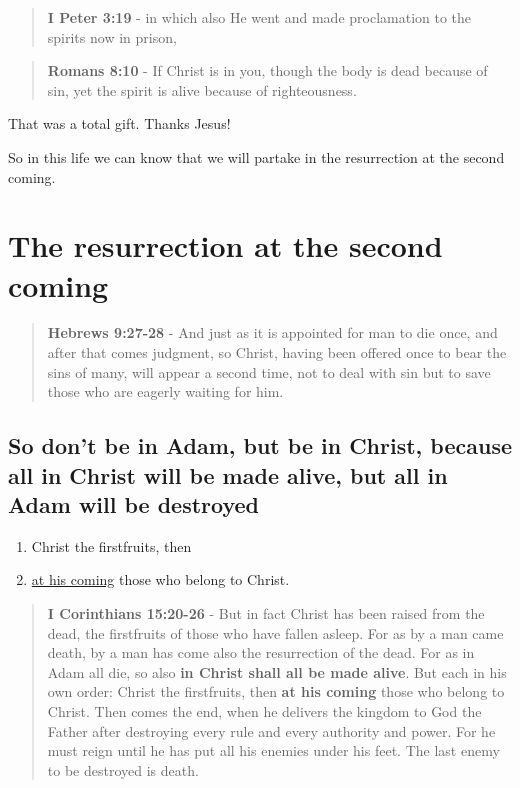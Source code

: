 \documentclass[11pt]{article}
\begin{document}
\begin{quote}
\textbf{I Peter 3:19} - in which also He went and made proclamation to the spirits now in prison,
\end{quote}

\begin{quote}
\textbf{Romans 8:10} - If Christ is in you, though the body is dead because of sin, yet the spirit is alive because of righteousness.
\end{quote}

That was a total gift. Thanks Jesus!

So in this life we can know that we will partake in the resurrection at the second coming.

\section{The resurrection at the second coming}
\label{sec:orgade0ee0}
\begin{quote}
\textbf{Hebrews 9:27-28} - And just as it is appointed for man to die once, and after that comes judgment, so Christ, having been offered once to bear the sins of many, will appear a second time, not to deal with sin but to save those who are eagerly waiting for him.
\end{quote}

\subsection{So don't be in Adam, but be in Christ, because all in Christ will be made alive, but all in Adam will be destroyed}
\label{sec:orgb475613}
\begin{enumerate}
\item Christ the firstfruits, then
\item \uline{at his coming} those who belong to Christ.
\end{enumerate}

\begin{quote}
\textbf{I Corinthians 15:20-26} - But in fact Christ has been raised from the dead, the firstfruits of those who have fallen asleep.  For as by a man came death, by a man has come also the resurrection of the dead.  For as in Adam all die, so also \textbf{in Christ shall all be made alive}.  But each in his own order: Christ the firstfruits, then \textbf{at his coming} those who belong to Christ.  Then comes the end, when he delivers the kingdom to God the Father after destroying every rule and every authority and power.  For he must reign until he has put all his enemies under his feet.  The last enemy to be destroyed is death.
\end{quote}
\end{document}

